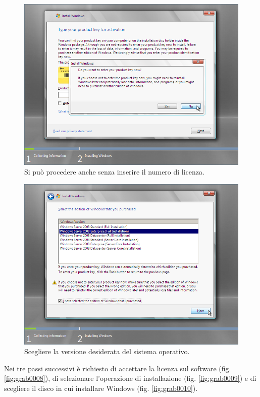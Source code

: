 \begin{figure}[htbp]
 \centering
 \includegraphics[scale=0.5]{images/grab0006}
 \caption{ Si può procedere anche senza inserire il numero di licenza.}
\label{fig:grab0006}
\end{figure}

\begin{figure}[htbp]
 \centering
 \includegraphics[scale=0.5]{images/grab0007}
 \caption{Scegliere la versione desiderata del sistema operativo.}
\label{fig:grab0007}
\end{figure}

\indent \newpage Nei tre passi successivi è richiesto di accettare la licenza sul software
(fig. \ref{fig:grab0008}), di selezionare l’operazione di installazione (fig. \ref{fig:grab0009}) e di scegliere il
disco in cui installare Windows (fig. \ref{fig:grab0010}).

